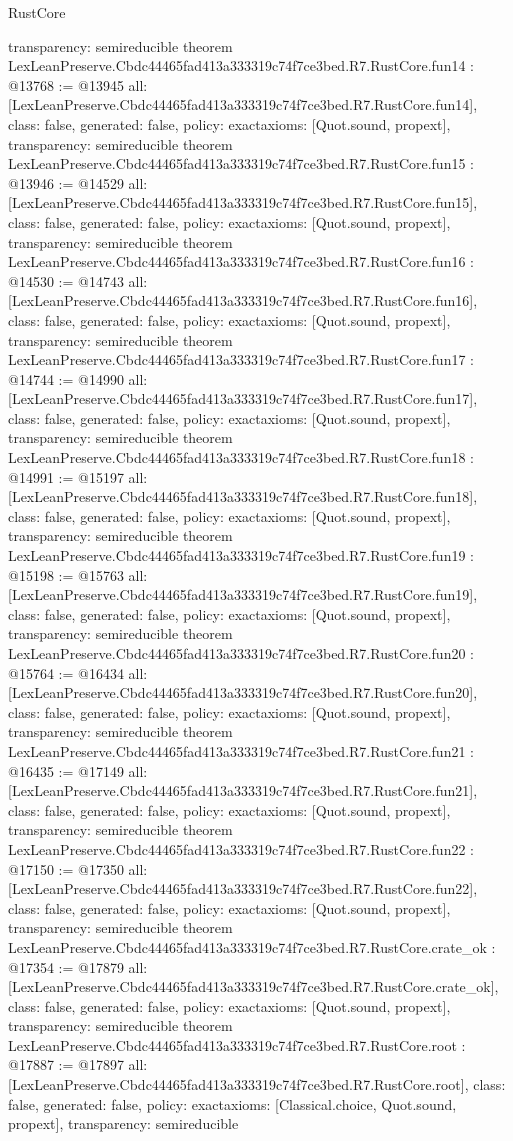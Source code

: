 \begin{lexlean}{RustCore}
\begin{coremodule}
{  transparency: semireducible
}
theorem LexLeanPreserve.Cbdc44465fad413a333319c74f7ce3bed.R7.RustCore.fun14 : @13768 := @13945 {
  all: [LexLeanPreserve.Cbdc44465fad413a333319c74f7ce3bed.R7.RustCore.fun14],
  class: false,
  generated: false,
  policy: exact{axioms: [Quot.sound, propext]},
  transparency: semireducible
}
theorem LexLeanPreserve.Cbdc44465fad413a333319c74f7ce3bed.R7.RustCore.fun15 : @13946 := @14529 {
  all: [LexLeanPreserve.Cbdc44465fad413a333319c74f7ce3bed.R7.RustCore.fun15],
  class: false,
  generated: false,
  policy: exact{axioms: [Quot.sound, propext]},
  transparency: semireducible
}
theorem LexLeanPreserve.Cbdc44465fad413a333319c74f7ce3bed.R7.RustCore.fun16 : @14530 := @14743 {
  all: [LexLeanPreserve.Cbdc44465fad413a333319c74f7ce3bed.R7.RustCore.fun16],
  class: false,
  generated: false,
  policy: exact{axioms: [Quot.sound, propext]},
  transparency: semireducible
}
theorem LexLeanPreserve.Cbdc44465fad413a333319c74f7ce3bed.R7.RustCore.fun17 : @14744 := @14990 {
  all: [LexLeanPreserve.Cbdc44465fad413a333319c74f7ce3bed.R7.RustCore.fun17],
  class: false,
  generated: false,
  policy: exact{axioms: [Quot.sound, propext]},
  transparency: semireducible
}
theorem LexLeanPreserve.Cbdc44465fad413a333319c74f7ce3bed.R7.RustCore.fun18 : @14991 := @15197 {
  all: [LexLeanPreserve.Cbdc44465fad413a333319c74f7ce3bed.R7.RustCore.fun18],
  class: false,
  generated: false,
  policy: exact{axioms: [Quot.sound, propext]},
  transparency: semireducible
}
theorem LexLeanPreserve.Cbdc44465fad413a333319c74f7ce3bed.R7.RustCore.fun19 : @15198 := @15763 {
  all: [LexLeanPreserve.Cbdc44465fad413a333319c74f7ce3bed.R7.RustCore.fun19],
  class: false,
  generated: false,
  policy: exact{axioms: [Quot.sound, propext]},
  transparency: semireducible
}
theorem LexLeanPreserve.Cbdc44465fad413a333319c74f7ce3bed.R7.RustCore.fun20 : @15764 := @16434 {
  all: [LexLeanPreserve.Cbdc44465fad413a333319c74f7ce3bed.R7.RustCore.fun20],
  class: false,
  generated: false,
  policy: exact{axioms: [Quot.sound, propext]},
  transparency: semireducible
}
theorem LexLeanPreserve.Cbdc44465fad413a333319c74f7ce3bed.R7.RustCore.fun21 : @16435 := @17149 {
  all: [LexLeanPreserve.Cbdc44465fad413a333319c74f7ce3bed.R7.RustCore.fun21],
  class: false,
  generated: false,
  policy: exact{axioms: [Quot.sound, propext]},
  transparency: semireducible
}
theorem LexLeanPreserve.Cbdc44465fad413a333319c74f7ce3bed.R7.RustCore.fun22 : @17150 := @17350 {
  all: [LexLeanPreserve.Cbdc44465fad413a333319c74f7ce3bed.R7.RustCore.fun22],
  class: false,
  generated: false,
  policy: exact{axioms: [Quot.sound, propext]},
  transparency: semireducible
}
theorem LexLeanPreserve.Cbdc44465fad413a333319c74f7ce3bed.R7.RustCore.crate_ok : @17354 := @17879 {
  all: [LexLeanPreserve.Cbdc44465fad413a333319c74f7ce3bed.R7.RustCore.crate_ok],
  class: false,
  generated: false,
  policy: exact{axioms: [Quot.sound, propext]},
  transparency: semireducible
}
theorem LexLeanPreserve.Cbdc44465fad413a333319c74f7ce3bed.R7.RustCore.root : @17887 := @17897 {
  all: [LexLeanPreserve.Cbdc44465fad413a333319c74f7ce3bed.R7.RustCore.root],
  class: false,
  generated: false,
  policy: exact{axioms: [Classical.choice, Quot.sound, propext]},
  transparency: semireducible
}


\end{coremodule}
\end{lexlean}
